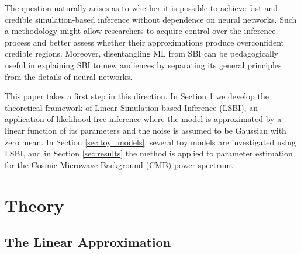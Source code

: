 \documentclass[%
 reprint,
 amsmath,amssymb,
 aps,
]{revtex4-2}
\begin{document}
The question naturally arises as to whether it is possible to achieve fast and credible simulation-based inference without dependence on neural networks. Such a methodology might allow researchers to acquire control over the inference process and better assess whether their approximations produce overconfident credible regions. Moreover, disentangling ML from SBI can be pedagogically useful in explaining SBI to new audiences by separating its general principles from the details of neural networks.

This paper takes a first step in this direction. In Section \ref{sec:theory} we develop the theoretical framework of Linear Simulation-based Inference (LSBI), an application of likelihood-free inference where the model is approximated by a linear function of its parameters and the noise is assumed to be Gaussian with zero mean. In Section \ref{sec:toy_models}, several toy models are investigated using LSBI, and in Section \ref{sec:results} the method is applied to parameter estimation for the Cosmic Microwave Background (CMB) power spectrum.

%

\section{Theory }\label{sec:theory}

\subsection{The Linear Approximation }\label{sec:linear_model}
\end{document}
